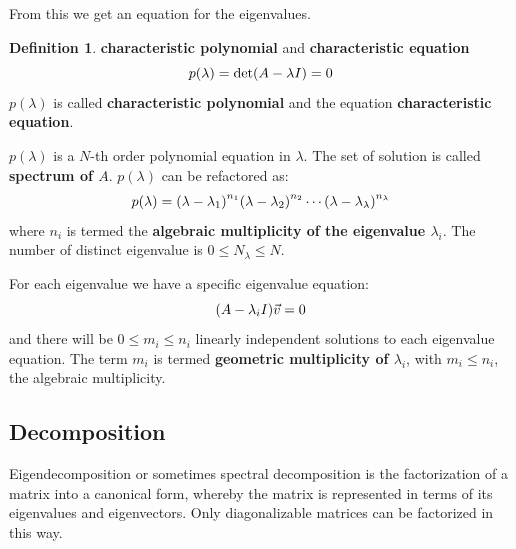 \documentclass[12pt, letterpaper]{article}
\theoremstyle{definition}
\newtheorem{definition}{Definition}[section]
\DeclarePairedDelimiter\autobracket{(}{)}
\newcommand{\br}[1]{\autobracket*{#1}}
\let\tb\textbf
\begin{document}
From this we get an equation for the eigenvalues.
\begin{definition}{\tb{characteristic polynomial} and \tb{characteristic equation}}
\begin{equation}
p(\lambda) = \det\br{A - \lambda I}  = 0
\end{equation}
$p(\lambda)$ is called \tb{characteristic polynomial} and the equation \tb{characteristic equation}.
\end{definition}
$p(\lambda)$ is a $N$-th order polynomial equation in $\lambda$. The set of solution is called \tb{spectrum of $A$}.  
$p(\lambda)$ can be refactored as:
\begin{equation}
p(\lambda) = \br{\lambda - \lambda_1}^{n_1} \br{\lambda - \lambda_2}^{n_2}\cdots \br{\lambda - \lambda_\lambda}^{n_\lambda}
\end{equation}
where $n_i$ is termed the \tb{algebraic multiplicity of the eigenvalue $\lambda_i$}. The number of distinct eigenvalue is $0\le N_\lambda\le N$.

For each eigenvalue we have a specific eigenvalue equation:
\begin{equation}
\br{A-\lambda_i I} \vec{v}= 0
\end{equation}
and there will be $0\le m_i \le n_i$ linearly independent solutions to each eigenvalue equation. The term $m_i$ is termed \tb{geometric multiplicity of $\lambda_i$}, with $m_i \le n_i$, the algebraic multiplicity.

\subsection{Decomposition}
Eigendecomposition or sometimes spectral decomposition is the factorization of a matrix into a canonical form, whereby the matrix is represented in terms of its eigenvalues and eigenvectors. Only diagonalizable matrices can be factorized in this way. 
\end{document}
